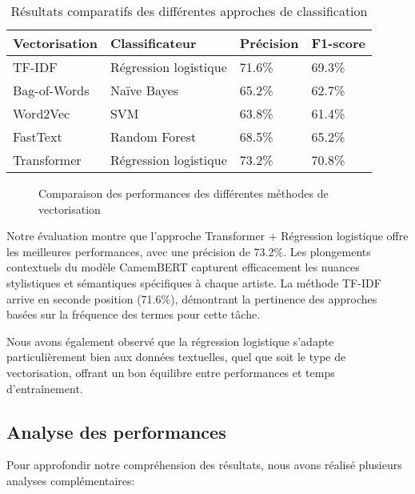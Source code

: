 \documentclass[a4paper,11pt]{article}
\begin{document}
\begin{table}[h]
\centering
\begin{tabular}{llll}
\toprule
\textbf{Vectorisation} & \textbf{Classificateur} & \textbf{Précision} & \textbf{F1-score} \\
\midrule
TF-IDF & Régression logistique & 71.6\% & 69.3\% \\
Bag-of-Words & Naïve Bayes & 65.2\% & 62.7\% \\
Word2Vec & SVM & 63.8\% & 61.4\% \\
FastText & Random Forest & 68.5\% & 65.2\% \\
Transformer & Régression logistique & 73.2\% & 70.8\% \\
\bottomrule
\end{tabular}
\caption{Résultats comparatifs des différentes approches de classification}
\label{tab:classification-results}
\end{table}

\begin{figure}[h]
    \centering
    \caption{Comparaison des performances des différentes méthodes de vectorisation}
    \label{fig:classif-comparison}
\end{figure}

Notre évaluation montre que l'approche Transformer + Régression logistique offre les meilleures performances, avec une précision de 73.2\%. Les plongements contextuels du modèle CamemBERT capturent efficacement les nuances stylistiques et sémantiques spécifiques à chaque artiste. La méthode TF-IDF arrive en seconde position (71.6\%), démontrant la pertinence des approches basées sur la fréquence des termes pour cette tâche.

Nous avons également observé que la régression logistique s'adapte particulièrement bien aux données textuelles, quel que soit le type de vectorisation, offrant un bon équilibre entre performances et temps d'entraînement.

\subsection{Analyse des performances}
Pour approfondir notre compréhension des résultats, nous avons réalisé plusieurs analyses complémentaires:
\end{document}
